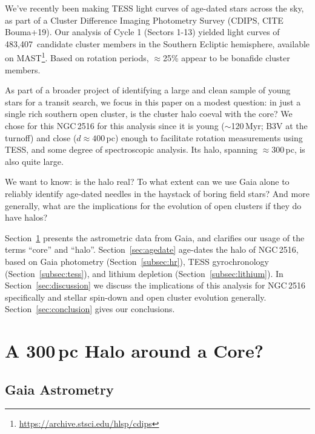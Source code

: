 \documentclass[12pt,twocolumn,tighten]{aastex63}
\newcommand{\numsouthernuniqlcs}{483{,}407\ } %
\begin{document}
We've recently been making TESS light curves of age-dated stars across
the sky, as part of a Cluster Difference Imaging Photometry Survey
(CDIPS, CITE Bouma+19).  Our analysis of Cycle 1 (Sectors 1-13) yielded
light curves of \numsouthernuniqlcs candidate cluster members in the
Southern Ecliptic hemisphere, available on
MAST\footnote{\url{https://archive.stsci.edu/hlsp/cdips}}.  Based on
rotation periods, $\approx$25\% appear to be bonafide cluster members. 

As part of a broader project of identifying a large and clean sample of
young stars for a transit search, we focus in this paper on a 
modest question: in just a single rich southern open cluster, is the
cluster halo coeval with the core?  We chose for this
NGC\,2516 for this analysis since it is young ($\sim$120\,Myr; B3V at
the turnoff) and close
($d\approx400$\,pc) enough to facilitate rotation measurements using
TESS, and some degree of spectroscopic analysis.  
Its halo, spanning $\approx$300\,pc, is also quite large.

We want to know: is
the halo real? To what extent can we use Gaia alone to reliably identify
age-dated needles in the haystack of boring field stars?  And more
generally, what are the implications for the evolution of open clusters
if they do have halos?

Section~\ref{sec:gaia} presents the astrometric data from Gaia, and
clarifies our usage of the terms ``core'' and ``halo''.
Section~\ref{sec:agedate} age-dates the halo of NGC\,2516, based on Gaia
photometry (Section~\ref{subsec:hr}), TESS gyrochronology
(Section~\ref{subsec:tess}), and lithium depletion
(Section~\ref{subsec:lithium}).  In Section~\ref{sec:discussion} we
discuss the implications of this analysis for NGC\,2516 specifically and
stellar spin-down and open cluster evolution generally.
Section~\ref{sec:conclusion} gives our conclusions.


\section{A 300\,pc Halo around a Core?}
\label{sec:gaia}
%
%

\subsection{Gaia Astrometry}
\label{subsec:astrometry}
\end{document}
